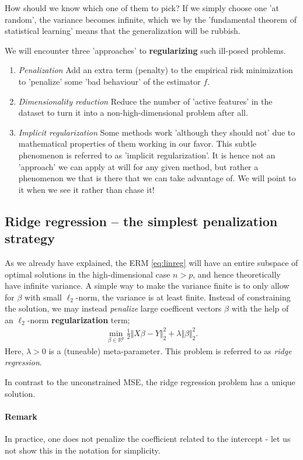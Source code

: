 \documentclass{article}
\newcommand{\R}{\mathbb{R}}
\newcommand{\norm}[1]{\Vert #1 \Vert}
\begin{document}
How should we know which one of them to pick? If we simply choose one 'at random', the variance becomes infinite, which we by the 'fundamental theorem of statistical learning' means that the generalization will be rubbish.

We will encounter three 'approaches' to \textbf{regularizing} such ill-posed problems.
\begin{enumerate}
    \item \emph{Penalization} Add an extra term (penalty) to the empirical risk minimization to 'penalize' some 'bad behaviour' of the estimator $f$.
    \item \emph{Dimensionality reduction} Reduce the number of 'active features' in the dataset to turn it into a non-high-dimensional problem after all.
    \item \emph{Implicit regularization} Some methods work 'although they should not' due to mathematical properties of them working in our favor. This subtle phenomenon is referred to as 'implicit regularization'. It is hence not an 'approach' we can apply at will for any given method, but rather a phenomenon we that is there that we can take advantage of. We will point to it when we see it rather than chase it!
\end{enumerate}

\subsection{Ridge regression -- the simplest penalization strategy}
As we already have explained, the ERM \eqref{eq:linreg} will have an entire subspace of optimal solutions in the high-dimensional case $n>p$, and hence theoretically have infinite variance. A simple way to make the variance finite is to only allow for $\beta$ with small $\ell_2$-norm, the variance is at least finite. Instead of constraining the solution, we may instead \emph{penalize} large coefficent vectors $\beta$ with the help of an  $\ell_2$-norm \textbf{regularization} term;
\begin{align}
    \min_{\beta \in \R^p} \tfrac{1}{2}\norm{X\beta-Y}_2^2 + \lambda \norm{\beta}_2^2. \label{eq:ridgeregression}
\end{align}
Here, $\lambda>0$ is a (tuneable) meta-parameter. This problem is referred to  as \emph{ridge regression}.

In contrast to the unconstrained MSE, the ridge regression problem has a unique solution.

\paragraph{Remark} In practice, one does not penalize the coefficient related to the intercept - let us not show this in the notation for simplicity.
\end{document}
